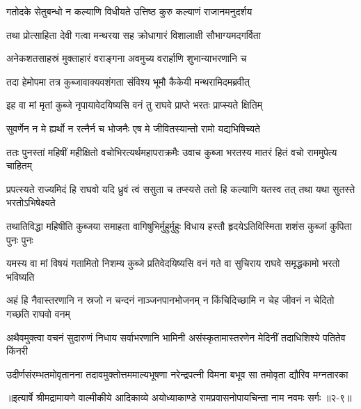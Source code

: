 \twolineshloka
{गतोदके सेतुबन्धो न कल्याणि विधीयते}
{उत्तिष्ठ कुरु कल्याणं राजानमनुदर्शय} %

\twolineshloka
{तथा प्रोत्साहिता देवी गत्वा मन्थरया सह}
{क्रोधागारं विशालाक्षी सौभाग्यमदगर्विता} %

\twolineshloka
{अनेकशतसाहस्रं मुक्ताहारं वराङ्गना}
{अवमुच्य वरार्हाणि शुभान्याभरणानि च} %

\twolineshloka
{तदा हेमोपमा तत्र कुब्जावाक्यवशंगता}
{संविश्य भूमौ कैकेयी मन्थरामिदमब्रवीत्} %

\twolineshloka
{इह वा मां मृतां कुब्जे नृपायावेदयिष्यसि}
{वनं तु राघवे प्राप्ते भरतः प्राप्स्यते क्षितिम्} %

\twolineshloka
{सुवर्णेन न मे ह्यर्थो न रत्नैर्न च भोजनैः}
{एष मे जीवितस्यान्तो रामो यद्यभिषिच्यते} %

\twolineshloka
{ततः पुनस्तां महिषीं महीक्षितो वचोभिरत्यर्थमहापराक्रमैः}
{उवाच कुब्जा भरतस्य मातरं हितं वचो राममुपेत्य चाहितम्} %

\twolineshloka
{प्रपत्स्यते राज्यमिदं हि राघवो यदि ध्रुवं त्वं ससुता च तप्स्यसे}
{ततो हि कल्याणि यतस्व तत् तथा यथा सुतस्ते भरतोऽभिषेक्ष्यते} %

\twolineshloka
{तथातिविद्धा महिषीति कुब्जया समाहता वागिषुभिर्मुहुर्मुहुः}
{विधाय हस्तौ हृदयेऽतिविस्मिता शशंस कुब्जां कुपिता पुनः पुनः} %

\twolineshloka
{यमस्य वा मां विषयं गतामितो निशम्य कुब्जे प्रतिवेदयिष्यसि}
{वनं गते वा सुचिराय राघवे समृद्धकामो भरतो भविष्यति} %

\twolineshloka
{अहं हि नैवास्तरणानि न स्रजो न चन्दनं नाञ्जनपानभोजनम्}
{न किंचिदिच्छामि न चेह जीवनं न चेदितो गच्छति राघवो वनम्} %

\twolineshloka
{अथैवमुक्त्वा वचनं सुदारुणं निधाय सर्वाभरणानि भामिनी}
{असंस्कृतामास्तरणेन मेदिनीं तदाधिशिश्ये पतितेव किंनरी} %

\twolineshloka
{उदीर्णसंरम्भतमोवृतानना तदावमुक्तोत्तममाल्यभूषणा}
{नरेन्द्रपत्नी विमना बभूव सा तमोवृता द्यौरिव मग्नतारका} %


॥इत्यार्षे श्रीमद्रामायणे वाल्मीकीये आदिकाव्ये अयोध्याकाण्डे रामप्रवासनोपायचिन्ता नाम नवमः सर्गः ॥२-९॥
